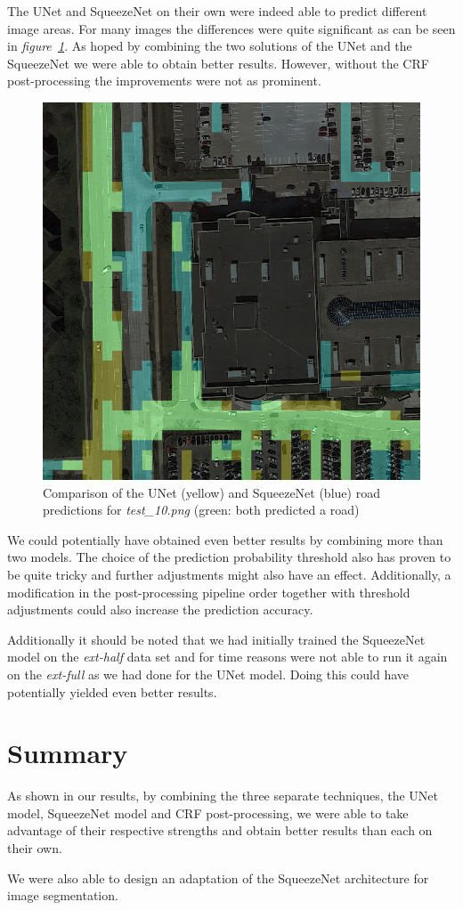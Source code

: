 \documentclass[10pt,conference,compsocconf]{IEEEtran}
\begin{document}
The UNet and SqueezeNet on their own were indeed able to predict different image areas. For many images the differences were quite significant as can be seen in \textit{figure~\ref{fig:comp}}. As hoped by combining the two solutions of the UNet and the SqueezeNet we were able to obtain better results. However, without the CRF post-processing the improvements were not as prominent.

\begin{figure}[ht]
  \centering
  \includegraphics[width=0.5\columnwidth]{images/comp_10.png}
  \captionsetup{justification=centering}
  \caption{Comparison of the UNet (yellow) and SqueezeNet (blue) road predictions for \textit{test\_10.png} (green: both predicted a road)}
  \label{fig:comp}
\end{figure}

We could potentially have obtained even better results by combining more than two models. The choice of the prediction probability threshold also has proven to be quite tricky and further adjustments might also have an effect. Additionally, a modification in the post-processing pipeline order together with threshold adjustments could also increase the prediction accuracy.

Additionally it should be noted that we had initially trained the SqueezeNet model on the \textit{ext-half} data set and for time reasons were not able to run it again on the \textit{ext-full} as we had done for the UNet model. Doing this could have potentially yielded even better results.

\section{Summary}
As shown in our results, by combining the three separate techniques, the UNet model, SqueezeNet model and CRF post-processing, we were able to take advantage of their respective strengths and obtain better results than each on their own.

We were also able to design an adaptation of the SqueezeNet architecture for image segmentation.



\end{document}

